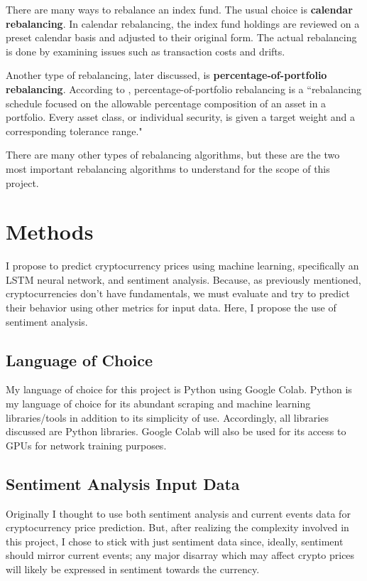 \documentclass[10pt,twocolumn]{article}
\begin{document}
There are many ways to rebalance an index fund. The usual choice is \textbf{calendar rebalancing}. In calendar rebalancing, the index fund holdings are reviewed on a preset calendar basis and adjusted to their original form. The actual rebalancing is done by examining issues such as transaction costs and drifts.

Another type of rebalancing, later discussed, is \textbf{percentage-of-portfolio rebalancing}. According to , percentage-of-portfolio rebalancing is a ``rebalancing schedule focused on the allowable percentage composition of an asset in a portfolio. Every asset class, or individual security, is given a target weight and a corresponding tolerance range."

There are many other types of rebalancing algorithms, but these are the two most important rebalancing algorithms to understand for the scope of this project.

\section{Methods}

I propose to predict cryptocurrency prices using machine learning, specifically an LSTM neural network, and sentiment analysis. Because, as previously mentioned, cryptocurrencies don’t have fundamentals, we must evaluate and try to predict their behavior using other metrics for input data. Here, I propose the use of sentiment analysis.

\subsection{Language of Choice}

My language of choice for this project is Python using Google Colab. Python is my language of choice for its abundant scraping and machine learning libraries/tools in addition to its simplicity of use. Accordingly, all libraries discussed are Python libraries. Google Colab will also be used for its access to GPUs for network training purposes.

\subsection{Sentiment Analysis Input Data}

Originally I thought to use both sentiment analysis and current events data for cryptocurrency price prediction. But, after realizing the complexity involved in this project, I chose to stick with just sentiment data since, ideally, sentiment should mirror current events; any major disarray which may affect crypto prices will likely be expressed in sentiment towards the currency.
\end{document}
